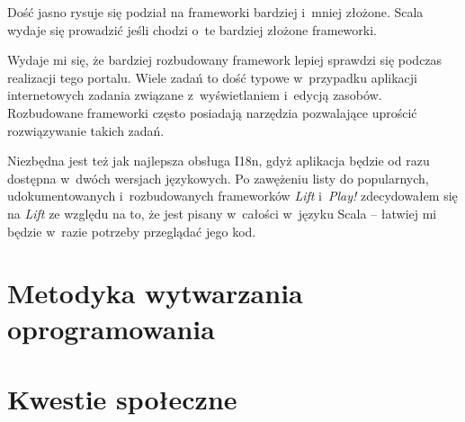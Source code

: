 \documentclass[a4paper]{article}
\begin{document}
Dość jasno rysuje się podział na frameworki bardziej i~mniej złożone.
Scala wydaje się prowadzić jeśli chodzi o~te bardziej złożone frameworki.

Wydaje mi się, że bardziej rozbudowany framework lepiej sprawdzi się podczas realizacji tego portalu.
Wiele zadań to dość typowe w~przypadku aplikacji internetowych zadania związane z~wyświetlaniem i~edycją zasobów.
Rozbudowane frameworki często posiadają narzędzia pozwalające uprościć rozwiązywanie takich zadań.

Niezbędna jest też jak najlepsza obsługa I18n, gdyż aplikacja będzie od razu dostępna w~dwóch wersjach językowych.
Po zawężeniu listy do popularnych, udokumentowanych i~rozbudowanych frameworków \emph{Lift} i~\emph{Play!} zdecydowałem się na \emph{Lift} ze względu na to, że jest pisany w~całości w~języku Scala -- łatwiej mi będzie w~razie potrzeby przeglądać jego kod.

\section{Metodyka wytwarzania oprogramowania}
\section{Kwestie społeczne}
\end{document}
